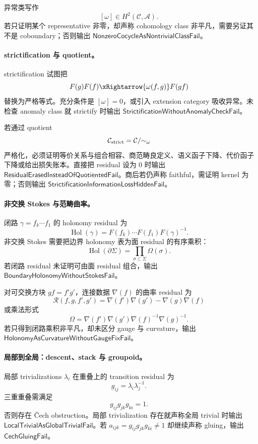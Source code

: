 异常类写作
\[
\boxed{
[\omega]\in H^2(\mathcal C,\mathcal A).
}
\]
若只证明某个 representative 非零，却声称 cohomology class 非平凡，需要另证其不是 coboundary；否则输出 \(\mathsf{NonzeroCocycleAsNontrivialClassFail}\)。

\paragraph{strictification 与 quotient。}
strictification 试图把
\[
F(g)F(f)\xRightarrow{\omega(f,g)}F(gf)
\]
替换为严格等式。充分条件是 \([\omega]=0\)，或引入 extension category 吸收异常。未检查 anomaly class 就 strictify 时输出 \(\mathsf{StrictificationWithoutAnomalyCheckFail}\)。

若通过 quotient
\[
\mathcal C_{\rm strict}=\mathcal C/ {\sim_\omega}
\]
严格化，必须证明等价关系与组合相容、商范畴良定义、语义函子下降、代价函子下降或给出损失账本。直接把 residual 设为 0 时输出 \(\mathsf{ResidualErasedInsteadOfQuotientedFail}\)。商后若仍声称 faithful，需证明 kernel 为零；否则输出 \(\mathsf{StrictificationInformationLossHiddenFail}\)。

\paragraph{非交换 Stokes 与范畴曲率。}
闭路 \(\gamma=f_k\cdots f_1\) 的 holonomy residual 为
\[
\boxed{
\operatorname{Hol}(\gamma)
=
F(f_k)\cdots F(f_1)F(\gamma)^{-1}.
}
\]
非交换 Stokes 需要把边界 holonomy 表为面 residual 的有序乘积：
\[
\operatorname{Hol}(\partial\Sigma)
=
\prod_{\sigma\subset\Sigma}\Omega(\sigma).
\]
若闭路 residual 未证明可由面 residual 组合，输出 \(\mathsf{BoundaryHolonomyWithoutStokesFail}\)。

对可交换方块 \(gf=f'g'\)，连接数据 \(\nabla(f)\) 的曲率 residual 为
\[
\boxed{
\mathcal R(f,g,f',g')
=
\nabla(f')\nabla(g')-\nabla(g)\nabla(f)
}
\]
或乘法形式
\[
\Omega=\nabla(f')\nabla(g')\nabla(f)^{-1}\nabla(g)^{-1}.
\]
若只得到闭路乘积非平凡，却未区分 gauge 与 curvature，输出 \(\mathsf{HolonomyAsCurvatureWithoutGaugeFixFail}\)。

\paragraph{局部到全局：descent、stack 与 groupoid。}
局部 trivializations \(\lambda_i\) 在重叠上的 transition residual 为
\[
g_{ij}=\lambda_i\lambda_j^{-1}.
\]
三重重叠需满足
\[
g_{ij}g_{jk}g_{ki}=1.
\]
否则存在 Čech obstruction。局部 trivialization 存在就声称全局 trivial 时输出 \(\mathsf{LocalTrivialAsGlobalTrivialFail}\)。若 \(a_{ijk}=g_{ij}g_{jk}g_{ki}\ne1\) 却继续声称 gluing，输出 \(\mathsf{CechGluingFail}\)。

